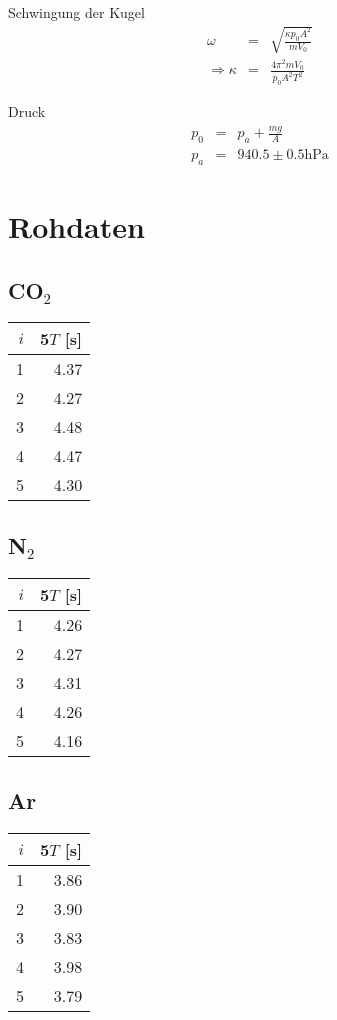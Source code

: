 \documentclass[12pt,a4paper]{article}
\begin{document}
Schwingung der Kugel
\begin{eqnarray}
\omega & = & \sqrt{\frac{\kappa p_0 A^2}{m V_0}} \\
\Rightarrow \kappa & = & \frac{4\pi ^2 m V_0}{p_0 A^2 T^2}\label{eq:k}
\end{eqnarray}

Druck
\begin{eqnarray}
p_0 & = & p_a + \frac{mg}{A} \\
p_a & = & 940.5 \pm 0.5 \mbox{hPa}
\end{eqnarray}

\section*{Rohdaten}
\subsection*{CO$_2$}
\begin{tabular}{|r|r|}
\hline
$i$&5$T$ [s]\\
\hline
1&4.37 \\
2&4.27 \\
3&4.48 \\
4&4.47 \\
5&4.30 \\
\hline
\end{tabular}

\subsection*{N$_2$}
\begin{tabular}{|r|r|}
\hline
$i$&5$T$ [s]\\
\hline
1&4.26 \\
2&4.27 \\
3&4.31 \\
4&4.26 \\
5&4.16 \\
\hline
\end{tabular}

\subsection*{Ar}
\begin{tabular}{|r|r|}
\hline
$i$&5$T$ [s]\\
\hline
1&3.86 \\
2&3.90 \\
3&3.83 \\
4&3.98 \\
5&3.79 \\
\hline
\end{tabular}
\end{document}
